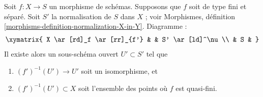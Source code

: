 \begin{lemma}
\label{lemma-finite-type-separated}
Soit $f : X \to S$ un morphisme de schémas.
Supposons que $f$ soit de type fini et séparé.
Soit $S'$ la normalisation de $S$ dans $X$ ; voir
Morphismes, définition \ref{morphisms-definition-normalization-X-in-Y}.
Diagramme :
$$
\xymatrix{
X \ar[rd]_f \ar[rr]_{f'} & & S' \ar[ld]^\nu \\
& S &
}
$$
Il existe alors un sous-schéma ouvert $U' \subset S'$ tel que
\begin{enumerate}
\item $(f')^{-1}(U') \to U'$ soit un isomorphisme, et
\item $(f')^{-1}(U') \subset X$ soit l'ensemble des points où
$f$ est quasi-fini.
\end{enumerate}
\end{lemma}

